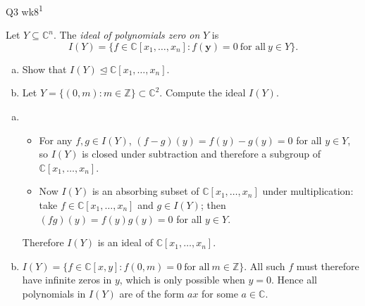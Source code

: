 \begin{problem}{Q3 wk8\textsuperscript{1}}{}    


    Let $Y \subseteq \mathbb{C}^n$. The \textit{ideal of polynomials zero on} $Y$ is
        $$ I(Y) = \{ f \in \mathbb{C}[x_1, \ldots, x_n] : f(\mathbf{y}) = 0 \ \text{for all} \ y \in Y \} . $$
    \begin{enumerate}[a)]
        \item Show that $I(Y) \trianglelefteq \mathbb{C}[x_1, \ldots, x_n]$.
        \item Let $Y = \{ (0, m) : m \in \mathbb{Z} \} \subset \mathbb{C}^2$. Compute the ideal $I(Y)$.
    \end{enumerate}

    \tcblower

    \begin{enumerate}[a)]
        \item
            \begin{itemize}
                \item For any $f, g \in I(Y)$, $(f - g)(y) = f(y) - g(y) = 0$ for all $y \in Y$, so $I(Y)$ is closed under subtraction and therefore a subgroup of $\mathbb{C}[x_1, \ldots, x_n]$.
                \item Now $I(Y)$ is an absorbing subset of $\mathbb{C}[x_1, \ldots, x_n]$ under multiplication: take $f \in \mathbb{C}[x_1, \ldots, x_n]$ and $g \in I(Y)$; then $(fg)(y) = f(y) g(y) = 0$ for all $y \in Y$.
            \end{itemize}
            Therefore $I(Y)$ is an ideal of $\mathbb{C}[x_1, \ldots, x_n]$.
        \item $I(Y) = \{ f \in \mathbb{C}[x, y] : f(0, m) = 0 \ \text{for all} \ m \in \mathbb{Z} \}$. All such $f$ must therefore have infinite zeros in $y$, which is only possible when $y = 0$. Hence all polynomials in $I(Y)$ are of the form $ax$ for some $a \in \mathbb{C}$.
    \end{enumerate}

\end{problem}

